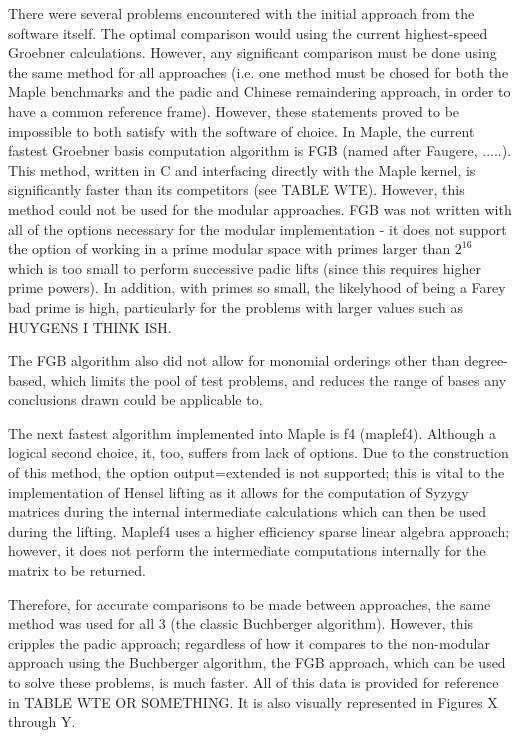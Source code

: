 \documentclass{article}
\begin{document}
\par There were several problems encountered with the initial approach from the software itself.  The optimal comparison would using the current highest-speed Groebner calculations.  However, any significant comparison must be done using the same method for all approaches (i.e. one method must be chosed for both the Maple benchmarks and the padic and Chinese remaindering approach, in order to have a common reference frame).  
However, these statements proved to be impossible to both satisfy with the software of choice.  In Maple, the current fastest Groebner basis computation algorithm is FGB (named after Faugere, .....).  This method, written in C and interfacing directly with the Maple kernel, is significantly faster than its competitors (see TABLE WTE).  However, this method could not be used for the modular approaches.  FGB was not written with all of the options necessary for the modular implementation - it does not support the option of working in a prime modular space with primes larger than $2^{16}$ which is too small to perform successive padic lifts (since this requires higher prime powers).  In addition, with primes so small, the likelyhood of being a Farey bad prime is high, particularly for the problems with larger values such as HUYGENS I THINK ISH.  
\par The FGB algorithm also did not allow for monomial orderings other than degree-based, which limits the pool of test problems, and reduces the range of bases any conclusions drawn could be applicable to.
\par The next fastest algorithm implemented into Maple is f4 (maplef4).  Although a logical second choice, it, too, suffers from lack of options.  Due to the construction of this method, the option output=extended is not supported; this is vital to the implementation of Hensel lifting as it allows for the computation of Syzygy matrices during the internal intermediate calculations which can then be used during the lifting.  Maplef4 uses a higher efficiency sparse linear algebra approach; however, it does not perform the intermediate computations internally for the matrix to be returned.
\par Therefore, for accurate comparisons to be made between approaches, the same method was used for all 3 (the classic Buchberger algorithm).  However, this cripples the padic approach; regardless of how it compares to the non-modular approach using the Buchberger algorithm, the FGB approach, which can be used to solve these problems, is much faster.  All of this data is provided for reference in TABLE WTE OR SOMETHING.  It is also visually represented in Figures X through Y.
\end{document}
